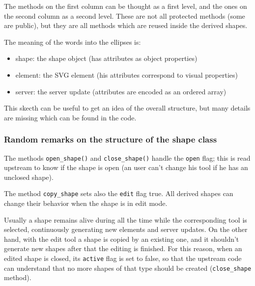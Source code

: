 \documentclass[10pt,a4paper,english]{book}
\begin{document}
The methods on the first column can be thought as a first level, and
the ones on the second column as a second level. These are not all
protected methods (some are public), but they are all methods which
are reused inside the derived shapes.

The meaning of the words into the ellipses is:
\begin{itemize}
\item {} 
shape: the shape object (has attributes as object properties)

\item {} 
element: the SVG element (his attributes correspond to visual properties)

\item {} 
server: the server update (attributes are encoded as an ordered array)

\end{itemize}

This skecth can be useful to get an idea of the overall structure, but
many details are missing which can be found in the code.



\hypertarget{random-remarks-on-the-structure-of-the-shape-class}{}
\subsubsection{Random remarks on the structure of the shape class}
\label{random-remarks-on-the-structure-of-the-shape-class}

The methods \texttt{open{\_}shape()} and \texttt{close{\_}shape()} handle the \texttt{open}
flag; this is read upstream to know if the shape is open (an user
can't change his tool if he has an unclosed shape).

The method \texttt{copy{\_}shape} sets also the \texttt{edit} flag true. All
derived shapes can change their behavior when the shape is in edit
mode.

Usually a shape remains alive during all the time while the
corresponding tool is selected, continuously generating new elements
and server updates. On the other hand, with the edit tool a shape is
copied by an existing one, and it shouldn't generate new shapes after
that the editing is finished. For this reason, when an edited shape is
closed, its \texttt{active} flag is set to false, so that the upstream code
can understand that no more shapes of that type should be created
(\texttt{close{\_}shape} method).
\end{document}
